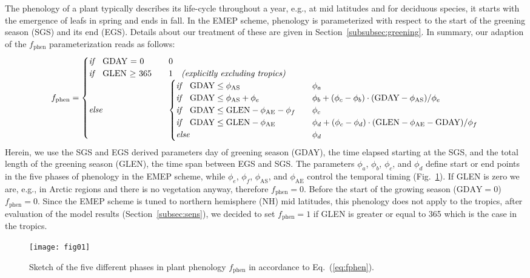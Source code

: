 \documentclass[gmd, manuscript]{copernicus}
\begin{document}
The phenology of a plant typically describes its life-cycle throughout a year, e.g., at mid latitudes and for deciduous species, it starts with the emergence of leafs in spring and ends in fall. In the EMEP scheme, phenology is parameterized with respect to the start of the greening season (SGS) and its end (EGS). Details about our treatment of these are given in Section~\ref{subsubsec:greening}. In summary, our adaption of the $f_\text{phen}$ parameterization reads as follows:
%
\begin{equation}
  f_\text{phen} =
  \begin{cases}
    \emph{if} \quad \text{GDAY = 0}  & \quad 0 \\
    \emph{if} \quad \text{GLEN $\ge$ 365} & \quad 1 \quad \emph{(explicitly excluding tropics)} \\
    \emph{else}  & \quad 
    \begin{cases}
      \emph{if} \quad \text{GDAY} \le \phi_\text{AS}  & \quad \phi_a \\
      \emph{if} \quad \text{GDAY} \le \phi_\text{AS} + \phi_e  & \quad \phi_b+(\phi_c-\phi_b)\cdot(\text{GDAY}-\phi_\text{AS})/\phi_e\\
      \emph{if} \quad \text{GDAY} \le \text{GLEN} - \phi_\text{AE} - \phi_f  & \quad \phi_c\\
      \emph{if} \quad \text{GDAY} \le \text{GLEN} - \phi_\text{AE}  & \quad \phi_d+(\phi_c-\phi_d)\cdot(\text{GLEN}-\phi_\text{AE}-\text{GDAY})/\phi_f\\
      \emph{else} & \quad \phi_d
    \end{cases}
  \end{cases}
  \label{eq:fphen}
\end{equation}
%
Herein, we use the SGS and EGS derived parameters day of greening season (GDAY), the time elapsed starting at the SGS, and the total length of the greening season (GLEN), the time span between EGS and SGS. The parameters $\phi_a$, $\phi_b$, $\phi_c$, and $\phi_d$ define start or end points in the five phases of phenology in the EMEP scheme, while $\phi_e$, $\phi_f$, $\phi_\text{AS}$, and $\phi_\text{AE}$ control the temporal timing (Fig.~\ref{fig:phenology}). If GLEN is zero we are, e.g., in Arctic regions and there is no vegetation anyway, therefore $f_\text{phen}=0$. Before the start of the growing season ($\text{GDAY}=0$) $f_\text{phen}=0$. Since the EMEP scheme is tuned to northern hemisphere (NH) mid latitudes, this phenology does not apply to the tropics, after evaluation of the model results (Section~\ref{subsec:sens}), we decided to set $f_\text{phen}=1$ if GLEN is greater or equal to 365 which is the case in the tropics.
%
\begin{figure}[t]
  \texttt{[image: fig01]}
  \caption{Sketch of the five different phases in plant phenology $f_\text{phen}$ in accordance to Eq.~(\ref{eq:fphen}).}
  \label{fig:phenology}
\end{figure}
\end{document}
